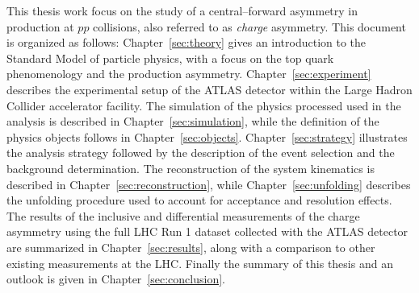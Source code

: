 This thesis work focus on the study of a central--forward asymmetry in
\ttbar{} production at $pp$ collisions, also referred to as {\it
  charge} asymmetry. This document is organized as follows:
Chapter~\ref{sec:theory} gives an introduction to the Standard Model
of particle physics, with a focus on the top quark phenomenology and
the production asymmetry. Chapter~\ref{sec:experiment} describes the
experimental setup of the ATLAS detector within the Large Hadron
Collider accelerator facility. The simulation of the physics processed
used in the analysis is described in Chapter~\ref{sec:simulation},
while the definition of the physics objects follows in
Chapter~\ref{sec:objects}. Chapter~\ref{sec:strategy} illustrates the
analysis strategy followed by the description of the event selection
and the background determination. The reconstruction of the \ttbar{}
system kinematics is described in Chapter~\ref{sec:reconstruction},
while Chapter~\ref{sec:unfolding} describes the unfolding procedure
used to account for acceptance and resolution effects.
The results of the inclusive and differential measurements of the
\ttbar{} charge asymmetry using the full LHC Run 1 dataset collected
with the ATLAS detector are summarized in Chapter~\ref{sec:results},
along with a comparison to other existing measurements at the LHC.
Finally the summary of this thesis and an outlook is given in
Chapter~\ref{sec:conclusion}.